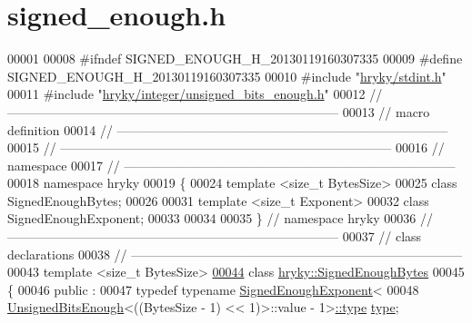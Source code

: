 \hypertarget{signed__enough_8h_source}{\section{signed\-\_\-enough.\-h}
}

\begin{DoxyCode}
00001 
00008 \textcolor{preprocessor}{#ifndef SIGNED\_ENOUGH\_H\_20130119160307335}
00009 \textcolor{preprocessor}{}\textcolor{preprocessor}{#define SIGNED\_ENOUGH\_H\_20130119160307335}
00010 \textcolor{preprocessor}{}\textcolor{preprocessor}{#include "\hyperlink{stdint_8h}{hryky/stdint.h}"}
00011 \textcolor{preprocessor}{#include "\hyperlink{unsigned__bits__enough_8h}{hryky/integer/unsigned_bits_enough.h}"}
00012 \textcolor{comment}{//
      ------------------------------------------------------------------------------}
00013 \textcolor{comment}{// macro definition}
00014 \textcolor{comment}{//
      ------------------------------------------------------------------------------}
00015 \textcolor{comment}{//
      ------------------------------------------------------------------------------}
00016 \textcolor{comment}{// namespace}
00017 \textcolor{comment}{//
      ------------------------------------------------------------------------------}
00018 \textcolor{keyword}{namespace }hryky
00019 \{
00024     \textcolor{keyword}{template} <\textcolor{keywordtype}{size\_t} BytesSize>
00025     \textcolor{keyword}{class }SignedEnoughBytes;
00026 
00031     \textcolor{keyword}{template} <\textcolor{keywordtype}{size\_t} Exponent>
00032     \textcolor{keyword}{class }SignedEnoughExponent;
00033     
00034 
00035 \} \textcolor{comment}{// namespace hryky}
00036 \textcolor{comment}{//
      ------------------------------------------------------------------------------}
00037 \textcolor{comment}{// class declarations}
00038 \textcolor{comment}{//
      ------------------------------------------------------------------------------}
00043 \textcolor{comment}{}\textcolor{keyword}{template} <\textcolor{keywordtype}{size\_t} BytesSize>
\hypertarget{signed__enough_8h_source_l00044}{}\hyperlink{classhryky_1_1_signed_enough_bytes}{00044} \textcolor{keyword}{class }\hyperlink{classhryky_1_1_signed_enough_bytes}{hryky::SignedEnoughBytes}
00045 \{
00046 \textcolor{keyword}{public} :
00047     \textcolor{keyword}{typedef} \textcolor{keyword}{typename} \hyperlink{classhryky_1_1_signed_enough_exponent}{SignedEnoughExponent}<
00048         \hyperlink{classhryky_1_1_unsigned_bits_enough}{UnsignedBitsEnough}<((BytesSize - 1) << 1)>::value - 1>\hyperlink{classhryky_1_1_signed_enough_exponent}{::type} \hyperlink{classhryky_1_1_signed_enough_exponent}{type};

\end{DoxyCode}
